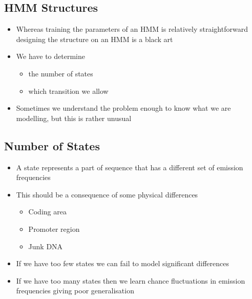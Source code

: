 \Outline %

\begin{slide}
\section{HMM Structures}

\begin{PauseHighLight}
  \begin{itemize}
  \item Whereas training the parameters of an HMM is relatively
    straightforward designing the structure on an HMM is a black
    art\pause
  \item We have to determine
    \begin{itemize}
    \item the number of states\pause
    \item which transition we allow\pause
    \end{itemize}
  \item Sometimes we understand the problem enough to know what we are
    modelling, but this is rather unusual\pause
  \end{itemize}
\end{PauseHighLight}

\end{slide}


\begin{slide}
\section[-2]{Number of States}

\begin{PauseHighLight}
  \begin{itemize}
  \item A state represents a part of sequence that has a different set
    of emission frequencies\pause
  \item This should be a consequence of some physical differences
    \begin{itemize}
    \item Coding area
    \item Promoter region
    \item Junk DNA\pause
    \end{itemize}
  \item If we have too few states we can fail to model significant
    differences\pause
  \item If we have too many states then we learn chance fluctuations in
    emission frequencies giving poor generalisation\pause
  \end{itemize}
\end{PauseHighLight}

\end{slide}

